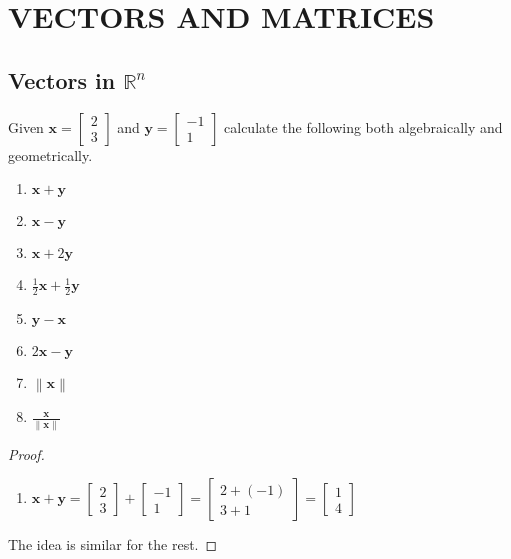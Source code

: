 \section{VECTORS AND MATRICES}
\subsection{Vectors in $\mathbb{R}^n$}

\begin{exercise} \label{e1.1.1}
    Given \( \mathbf{x} = \begin{bmatrix} 2 \\ 3 \end{bmatrix} \) and \( \mathbf{y} = \begin{bmatrix} -1 \\ 1 \end{bmatrix} \) calculate the following both algebraically and geometrically.
    \begin{enumerate}
        \item \( \mathbf{x}+\mathbf{y} \)
        \item \( \mathbf{x}-\mathbf{y} \)
        \item \( \mathbf{x}+2\mathbf{y} \)
        \item \( \frac{1}{2}\mathbf{x}+\frac{1}{2}\mathbf{y} \)
        \item \( \mathbf{y}-\mathbf{x} \)
        \item \( 2\mathbf{x}-\mathbf{y} \)
        \item \( \left\lVert \mathbf{x} \right\rVert \)
        \item \( \frac{\mathbf{x}}{\left\lVert \mathbf{x} \right\rVert} \)
    \end{enumerate}
    
    \begin{proof}
        \begin{enumerate}
            \item \( \mathbf{x}+\mathbf{y}=\begin{bmatrix} 2 \\ 3 \end{bmatrix} + \begin{bmatrix} -1 \\ 1 \end{bmatrix} = \begin{bmatrix} 2+(-1) \\ 3 + 1 \end{bmatrix} = \begin{bmatrix} 1 \\ 4 \end{bmatrix} \)
        \end{enumerate}
        
        The idea is similar for the rest.
    \end{proof}
\end{exercise}


